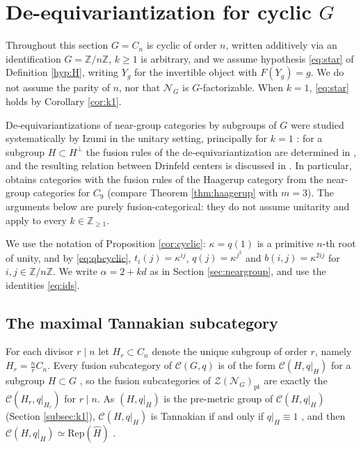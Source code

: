 \documentclass[10pt]{article}
\theoremstyle{plain}
\theoremstyle{definition}
\theoremstyle{plain}
\begin{document}
\section{De-equivariantization for cyclic \texorpdfstring{$G$}{G}}\label{sec:deeq}
 
Throughout this section $G=C_n$ is cyclic of order
$n$, written additively via an identification $G=\mathbb{Z}/n\mathbb{Z}$, $k\ge1$ is arbitrary, and we assume
hypothesis \eqref{eq:star} of Definition \ref{hyp:H},
writing $Y_g$ for the invertible object with $F(Y_g)=g$.  We do not assume the
parity of $n$, nor that $\mathcal{N}_G$ is $G$-factorizable.  When $k=1$,
\eqref{eq:star} holds by Corollary \ref{cor:k1}.

\par De-equivariantizations of near-group categories by subgroups of $G$ were studied systematically by Izumi in the unitary setting, principally for $k=1$ \cite[Section 12]{MR3635673}: for a subgroup $H\subset H^\perp$ the fusion rules of the de-equivariantization are determined in \cite[Theorems 12.3 and 12.5, Corollary 12.7]{MR3635673}, and the resulting relation between Drinfeld centers is discussed in \cite[Remark 12.10]{MR3635673}.  In particular, \cite[Example 12.14]{MR3635673} obtains categories with the fusion rules of the Haagerup category from the near-group categories for $C_9$ (compare Theorem \ref{thm:haagerup} with $m=3$).  The arguments below are purely fusion-categorical: they do not assume unitarity and apply to every $k\in\mathbb{Z}_{\geq1}$.

We use the notation of Proposition \ref{cor:cyclic}: $\kappa=q(1)$ is a primitive $n$-th root of unity, and by \eqref{eq:qbcyclic}, $t_i(j)=\kappa^{ij}$, $q(j)=\kappa^{j^2}$ and $b(i,j)=\kappa^{2ij}$ for $i,j\in\mathbb{Z}/n\mathbb{Z}$.
We write $\alpha=2+kd$ as in Section \ref{sec:neargroup}, and use the identities \eqref{eq:ids}.

 
\subsection{The maximal Tannakian subcategory}\label{subsec:maxtann}
 
For each divisor $r\mid n$ let $H_r\subset C_n$ denote the unique subgroup of order
$r$, namely $H_r=\tfrac nr C_n$.  Every fusion subcategory of $\mathcal{C}(G,q)$
is of the form $\mathcal{C}(H,q|_H)$ for a subgroup $H\subset G$ \cite[Section 2.11]{MR2609644},
so the fusion subcategories of $\mathcal{Z}(\mathcal{N}_G)_{\mathrm{pt}}$ are
exactly the $\mathcal{C}(H_r,q|_{H_r})$ for $r\mid n$. As $(H,q|_H)$ is the pre-metric group of $\mathcal{C}(H,q|_H)$ (Section \ref{subsec:k1}), $\mathcal{C}(H,q|_H)$ is Tannakian if and only if $q|_H\equiv1$ \cite[Example 2.48]{MR2609644}, and then $\mathcal{C}(H,q|_H)\simeq\mathrm{Rep}(\widehat{H})$ \cite[Example 2.45]{MR2609644}.
 
\end{document}
